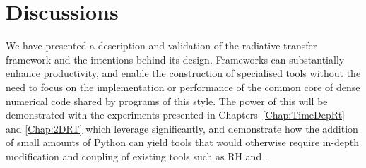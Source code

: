 \section{Discussions}

We have presented a description and validation of the \Lw{} radiative transfer framework and the intentions behind its design.
Frameworks can substantially enhance productivity, and enable the construction of specialised tools without the need to focus on the implementation or performance of the common core of dense numerical code shared by programs of this style.
The power of this will be demonstrated with the experiments presented in Chapters~\ref{Chap:TimeDepRt} and \ref{Chap:2DRT} which leverage \Lw{} significantly, and demonstrate how the addition of small amounts of Python can yield tools that would otherwise require in-depth modification and coupling of existing tools such as RH and \Radyn{}.